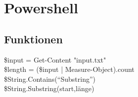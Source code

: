\chapter{Powershell}\label{chap:Powershell}
\section{Funktionen}
\$input = Get-Content "input.txt"\\
\$length = (\$input | Measure-Object).count\\
\$String.Contains(\enquote{Substring})\\
\$String.Substring(start,länge)